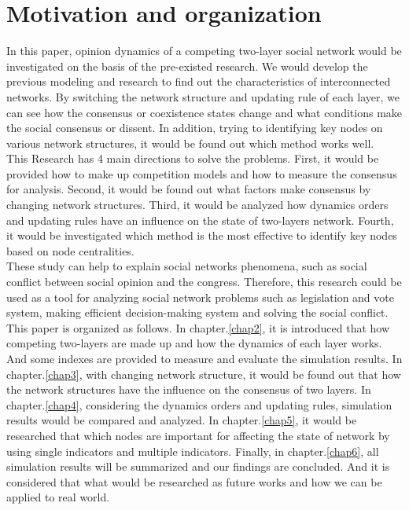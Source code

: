 \section{Motivation and organization}
In this paper, opinion dynamics of a competing two-layer social network would be investigated on the basis of the pre-existed research\parencite{alvarez2016, gomez2015, diep2017, rocca2014}. We would develop the previous modeling and research to find out the characteristics of interconnected networks. By switching the network structure and updating rule of each layer, we can see how the consensus or coexistence states change and what conditions make the social consensus or dissent. In addition, trying to identifying key nodes on various network structures, it would be found out which method works well.\\  

This Research has 4 main directions to solve the problems. First, it would be provided how to make up competition models and how to measure the consensus for analysis. Second, it would be found out what factors make consensus by changing network structures. Third, it would be analyzed how dynamics orders and updating rules have an influence on the state of two-layers network. Fourth, it would be investigated which method is the most effective to identify key nodes based on node centralities. \\

These study can help to explain social networks phenomena, such as social conflict between social opinion and the congress. Therefore, this research could be used as a tool for analyzing social network problems such as legislation and vote system, making efficient decision-making system and solving the social conflict. \\

This paper is organized as follows. In chapter.\ref{chap2}, it is introduced that how competing two-layers are made up and how the dynamics of each layer works. And some indexes are provided to measure and evaluate the simulation results. In chapter.\ref{chap3}, with changing network structure, it would be found out that how the network structures have the influence on the consensus of two layers. In chapter.\ref{chap4}, considering the dynamics orders and updating rules, simulation results would be compared and analyzed. In chapter.\ref{chap5}, it would be researched that which nodes are important for affecting the state of network by using single indicators and multiple indicators. Finally, in chapter.\ref{chap6}, all simulation results will be summarized and our findings are concluded. And it is considered that what would be researched as future works and how we can be applied to real world. 


